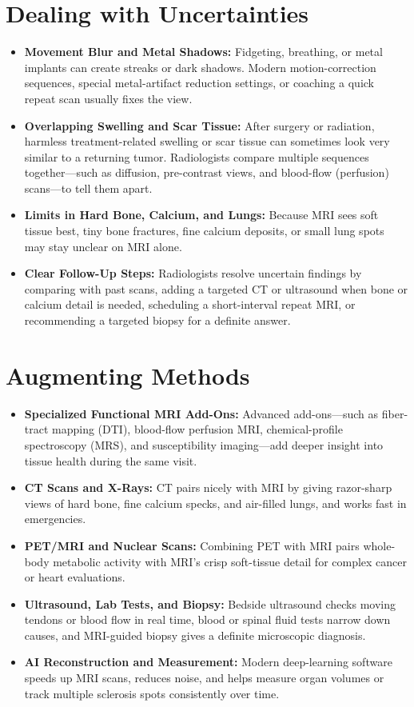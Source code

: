 \section{Dealing with Uncertainties}
\begin{itemize}
\item \textbf{Movement Blur and Metal Shadows:} Fidgeting, breathing, or metal implants can create streaks or dark shadows. Modern motion-correction sequences, special metal-artifact reduction settings, or coaching a quick repeat scan usually fixes the view.
\item \textbf{Overlapping Swelling and Scar Tissue:} After surgery or radiation, harmless treatment-related swelling or scar tissue can sometimes look very similar to a returning tumor. Radiologists compare multiple sequences together---such as diffusion, pre-contrast views, and blood-flow (perfusion) scans---to tell them apart.
\item \textbf{Limits in Hard Bone, Calcium, and Lungs:} Because MRI sees soft tissue best, tiny bone fractures, fine calcium deposits, or small lung spots may stay unclear on MRI alone.
\item \textbf{Clear Follow-Up Steps:} Radiologists resolve uncertain findings by comparing with past scans, adding a targeted CT or ultrasound when bone or calcium detail is needed, scheduling a short-interval repeat MRI, or recommending a targeted biopsy for a definite answer.
\end{itemize}

\section{Augmenting Methods}
\begin{itemize}
\item \textbf{Specialized Functional MRI Add-Ons:} Advanced add-ons---such as fiber-tract mapping (DTI), blood-flow perfusion MRI, chemical-profile spectroscopy (MRS), and susceptibility imaging---add deeper insight into tissue health during the same visit.
\item \textbf{CT Scans and X-Rays:} CT pairs nicely with MRI by giving razor-sharp views of hard bone, fine calcium specks, and air-filled lungs, and works fast in emergencies.
\item \textbf{PET/MRI and Nuclear Scans:} Combining PET with MRI pairs whole-body metabolic activity with MRI's crisp soft-tissue detail for complex cancer or heart evaluations.
\item \textbf{Ultrasound, Lab Tests, and Biopsy:} Bedside ultrasound checks moving tendons or blood flow in real time, blood or spinal fluid tests narrow down causes, and MRI-guided biopsy gives a definite microscopic diagnosis.
\item \textbf{AI Reconstruction and Measurement:} Modern deep-learning software speeds up MRI scans, reduces noise, and helps measure organ volumes or track multiple sclerosis spots consistently over time.
\end{itemize}

